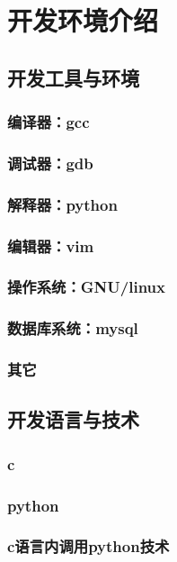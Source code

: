 \chapter{开发环境介绍}
\section{开发工具与环境}
\subsection{编译器：gcc}
\subsection{调试器：gdb}
\subsection{解释器：python}
\subsection{编辑器：vim}
\subsection{操作系统：GNU/linux}
\subsection{数据库系统：mysql}
\subsection{其它}
\section{开发语言与技术}
\subsection{c}
\subsection{python}
\subsection{c语言内调用python技术}

